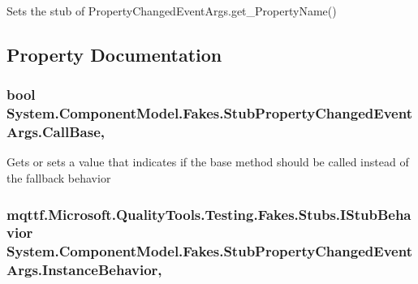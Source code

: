 Sets the stub of Property\-Changed\-Event\-Args.\-get\-\_\-\-Property\-Name()



\subsection{Property Documentation}
\hypertarget{class_system_1_1_component_model_1_1_fakes_1_1_stub_property_changed_event_args_adc44168fa8532075a388892037af3687}{
\subsubsection[{Call\-Base}]{\setlength{\rightskip}{0pt plus 5cm}bool System.\-Component\-Model.\-Fakes.\-Stub\-Property\-Changed\-Event\-Args.\-Call\-Base\hspace{0.3cm}{\ttfamily [get]}, {\ttfamily [set]}}}\label{class_system_1_1_component_model_1_1_fakes_1_1_stub_property_changed_event_args_adc44168fa8532075a388892037af3687}


Gets or sets a value that indicates if the base method should be called instead of the fallback behavior

\hypertarget{class_system_1_1_component_model_1_1_fakes_1_1_stub_property_changed_event_args_a0d7278c94a18caf144d836bf29dee9cf}{
\subsubsection[{Instance\-Behavior}]{\setlength{\rightskip}{0pt plus 5cm}mqttf.\-Microsoft.\-Quality\-Tools.\-Testing.\-Fakes.\-Stubs.\-I\-Stub\-Behavior System.\-Component\-Model.\-Fakes.\-Stub\-Property\-Changed\-Event\-Args.\-Instance\-Behavior\hspace{0.3cm}{\ttfamily [get]}, {\ttfamily [set]}}}\label{class_system_1_1_component_model_1_1_fakes_1_1_stub_property_changed_event_args_a0d7278c94a18caf144d836bf29dee9cf}


